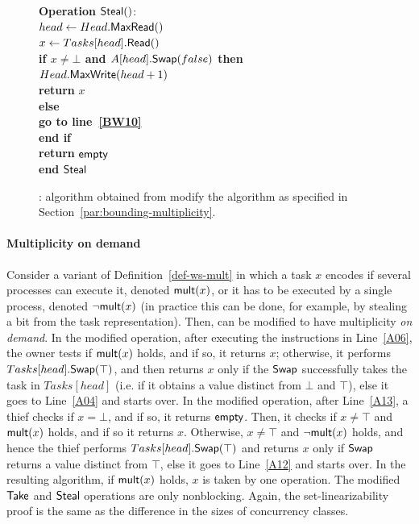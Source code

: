 \begin{figure}[H]
{\begin{minipage}[t]{150mm}
\begin{tabbing}
        {\bf Operation} \({\sf Steal}()\): \\
         \> \> \(head \leftarrow Head.{\sf MaxRead}()\)\\
         \> \> \(x \leftarrow Tasks[head].{\sf Read}()\) \\
         \> \> {\bf if \(x \neq \bot\) and \(A[head].{\sf Swap}(false)\) then}\\
         \> \> \> \(Head.{\sf MaxWrite}(head+1)\)\\

         \> \> \> {\bf return} \(x\)\\
         \> \> {\bf else } \\
         \> \> \> {\bf go to line~\ref{BW10}} \\
         \> \> {\bf end if}\\
         \> \> {\bf return} ${\sf empty}$\\
        {\bf end} ${\sf Steal}$

      \end{tabbing}
    \end{minipage}
  }
  \caption{\label{figure-b-w-mult}\BNCWSM: algorithm obtained from modify the algorithm \WFWSM as specified in Section~\ref{par:bounding-multiplicity}.}
\end{figure}

\paragraph*{Multiplicity on demand}

Consider a variant of Definition~\ref{def-ws-mult} in which a task \(x\) encodes if several processes can execute it, denoted \({\sf mult}(x)\), or it has to be executed by a single process, denoted \({\sf \neg mult}(x)\) (in practice this can be done, for example, by stealing a bit from the task representation). Then, \WFWSM can be modified to have multiplicity \emph{on demand}. In the modified \Take operation, after executing the instructions in Line~\ref{A06}, the owner tests if \({\sf mult}(x)\) holds, and if so, it returns \(x\); otherwise, it performs \(Tasks[head].{\sf Swap}(\top)\), and then returns \(x\) only if the \({\sf Swap}\) successfully takes the task in \(Tasks[head]\) (i.e. if it obtains a value distinct from $\bot$ and $\top$), else it goes to Line~\ref{A04} and starts over. In the modified \Steal operation, after Line~\ref{A13}, a thief checks if \(x = \bot\), and if so, it returns \({\sf empty}\). Then, it checks if \(x \neq \top\) and \({\sf mult}(x)\) holds, and if so it returns \(x\).  Otherwise, \(x \neq \top\) and \({\sf \neg mult}(x)\) holds, and hence the thief performs \(Tasks[head].{\sf Swap}(\top)\) and returns \(x\) only if \({\sf Swap}\) returns a value distinct from \(\top\), else it goes to Line~\ref{A12} and starts over.  In the resulting algorithm, if \({\sf mult}(x)\) holds, \(x\) is taken by one operation.  The modified ${\sf Take}$ and ${\sf Steal}$ operations are only nonblocking.  Again, the set-linearizability proof is the same as the difference in the sizes of concurrency classes.


